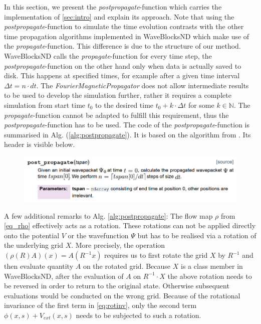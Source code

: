 \documentclass[11pt, a4paper, oneside]{article}
\begin{document}
In this section, we present the \emph{postpropagate}-function which carries the implementation of \cref{sec:intro} and explain its approach. Note that using the \emph{postpropagate}-function to simulate the time evolution contrasts with the other time propagation algorithms implemented in WaveBlocksND which make use of the \emph{propagate}-function. This difference is due to the structure of our method. WaveBlocksND calls the \emph{propagate}-function for every time step, the \emph{postpropagate}-function on the other hand only when data is actually saved to disk. This happens at specified times, for example after a given time interval $\Delta t = n\cdot dt$. The \emph{FourierMagneticPropagator} does not allow intermediate results to be used to develop the simulation further, rather it requires a complete simulation from start time $t_0$ to the desired time $t_0 + k\cdot \Delta t$ for some $k\in \mathbb{N}$.
The \emph{propagate}-function cannot be adapted to fulfill this requirement, thus the \emph{postpropagate}-function has to be used.\newline
The code of the \emph{postpropagate}-function is summarised in Alg. (\ref{alg:postpropagate}). It is based on the algorithm from . Its header is visible below.
\begin{figure}[ht]
  \centering
  \includegraphics[width = 0.9 \textwidth]{graphics/doc_postpropagate.PNG}
\end{figure}

A few additional remarks to Alg. \ref{alg:postpropagate}: The flow map $\rho$ from \cref{eq_rho} effectively acts as a rotation. These rotations can not be applied directly onto the potential $V$ or the wavefunction $\Psi$ but has to be realised via a rotation of the underlying grid $X$. More precisely, the operation $(\rho(R)A)(x) = A(R^{-1}x)$ requires us to first rotate the grid $X$ by $R^{-1}$ and then evaluate quantity $A$ on the rotated grid. Because $X$ is a class member in WaveBlocksND, after the evaluation of $A$ on $R^{-1}\cdot X$ the above rotation needs to be reversed in order to return to the original state. Otherwise subsequent evaluations would be conducted on the wrong grid.\newline
Because of the rotational invariance of the first term in \cref{eq:rotinv}, only the second term $\phi(x,s) + V_{ext}(x,s)$ needs to be subjected to such a rotation. \newline
\end{document}
